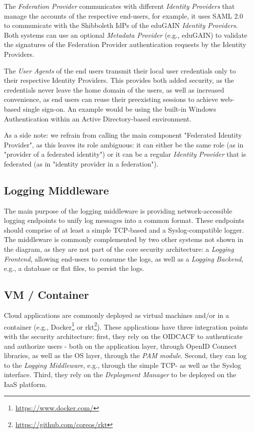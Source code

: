 \documentclass{llncs}
\begin{document}
The \textit{Federation Provider} communicates with different \textit{Identity Providers} that manage the accounts of the respective end-users, for example, it uses SAML 2.0 to communicate with the Shibboleth IdPs of the eduGAIN \textit{Identity Providers}. Both systems can use an optional \textit{Metadata Provider} (e.g., eduGAIN) to validate the signatures of the Federation Provider authentication requests by the Identity Providers.

The \textit{User Agents} of the end users transmit their local user credentials only to their respective Identity Providers. This provides both added security, as the credentials never leave the home domain of the users, as well as increased convenience, as end users can reuse their preexisting sessions to achieve web-based single sign-on. An example would be using the built-in Windows Authentication within an Active Directory-based environment.

As a side note: we refrain from calling the main component "Federated Identity Provider", as this leaves its role ambiguous: it can either be the same role (as in "provider of a federated identity") or it can be a regular \textit{Identity Provider} that is federated (as in "identity provider in a federation").

\subsection{Logging Middleware}

The main purpose of the logging middleware is providing network-accessible logging endpoints to unify log messages into a common format. These endpoints should comprise of at least a simple TCP-based and a Syslog-compatible logger. The middleware is commonly complemented by two other systems not shown in the diagram, as they are not part of the core security architecture: a \textit{Logging Frontend}, allowing end-users to consume the logs, as well as a \textit{Logging Backend}, e.g., a database or flat files, to persist the logs.

\subsection{VM / Container}

Cloud applications are commonly deployed as virtual machines and/or in a container (e.g., Docker\footnote{\url{https://www.docker.com/}} or rkt\footnote{\url{https://github.com/coreos/rkt}}). These applications have three integration points with the security architecture: first, they rely on the OIDCACF to authenticate and authorize users - both on the application layer, through OpenID Connect libraries, as well as the OS layer, through the \textit{PAM module}. Second, they can log to the \textit{Logging Middleware}, e.g., through the simple TCP- as well as the Syslog interface. Third, they rely on the \textit{Deployment Manager} to be deployed on the IaaS platform.
\end{document}
